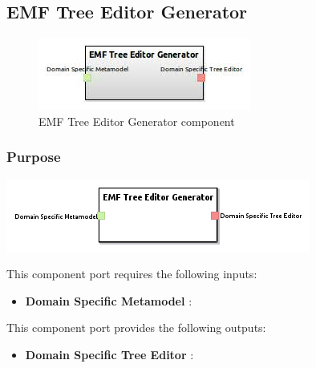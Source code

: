\documentclass{gemoc} %
\begin{document}
\subsection{EMF Tree Editor Generator}

\begin{figure}[htp]
	\begin{center}
	\includegraphics*[trim=0.0cm 0.0cm 0cm 0.0cm, clip=true, scale=1.0]{../images/generated/Generated_EMF Tree Editor Generator.jpg}
	\caption{EMF Tree Editor Generator component}
	\end{center}
\end{figure}

\subsubsection{Purpose}

\begin{center}
\includegraphics*[trim=0.0cm 0.0cm 0cm 0.0cm, clip=true]{../images/generated/Generated_EMF_Tree_Editor_Generator.png}
\end{center}

This component port requires the following inputs:
\begin{itemize}
  \item \textbf{Domain Specific Metamodel} :
\end{itemize}

This component port provides the following outputs:
\begin{itemize}
  \item \textbf{Domain Specific Tree Editor} :
\end{itemize}
\end{document}
